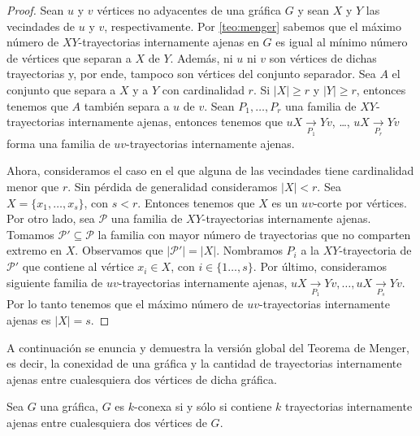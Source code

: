 \begin{proof}
    Sean $u$ y $v$ v\'ertices no adyacentes de una gr\'afica $G$ y sean $X$ y
    $Y$ las vecindades de $u$ y $v$, respectivamente. Por \cref{teo:menger}
    sabemos que el m\'aximo n\'umero de $XY$-trayectorias internamente ajenas en
    $G$ es igual al m\'inimo n\'umero de v\'ertices que separan a $X$ de $Y$.
    Adem\'as, ni $u$ ni $v$ son v\'ertices de dichas trayectorias y, por ende,
    tampoco son v\'ertices del conjunto separador. Sea  $A$ el conjunto que
    separa a $X$ y a $Y$ con cardinalidad $r$. Si $|X| \geq r$ y $|Y| \geq r$,
    entonces tenemos que $A$ tambi\'en separa a $u$ de $v$. Sean $P_1, \dots,
    P_r$ una familia de $XY$-trayectorias internamente ajenas, entonces tenemos
    que $uX\xrightarrow[P_1]{}Yv$, \dots, $uX\xrightarrow[P_r]{}Yv$ forma una
    familia de $uv$-trayectorias internamente ajenas. 

    Ahora, consideramos el caso en el que alguna de las vecindades tiene
    cardinalidad menor que $r$.  Sin p\'erdida de generalidad consideramos
    $|X|<r$. Sea $X = \{x_1, \dots, x_s\}$, con $s<r$. Entonces tenemos que $X$
    es un $uv$-corte por v\'ertices. Por otro lado, sea $\mathcal{P}$ una
    familia de $XY$-trayectorias internamente ajenas. Tomamos $\mathcal{P'}
    \subseteq \mathcal{P}$ la familia con mayor n\'umero de trayectorias que no
    comparten extremo en $X$. Observamos que $|\mathcal{P'}| = |X|$. Nombramos
    $P_i$ a la $XY$-trayectoria de $\mathcal{P'}$ que contiene al v\'ertice $x_i
    \in X$, con $i \in \{1 \dots, s\}$. Por \'ultimo, consideramos siguiente
    familia de $uv$-trayectorias internamente ajenas, $uX\xrightarrow[P_1]{}Yv,
    \dots, uX\xrightarrow[P_s]{}Yv$. Por lo tanto tenemos que el m\'aximo
    n\'umero de $uv$-trayectorias internamente ajenas es $|X|=s$.
\end{proof}


A continuaci\'on  se enuncia y demuestra la versi\'on global del Teorema de
Menger, es decir, la conexidad de una gr\'afica y la cantidad de trayectorias
internamente ajenas entre cualesquiera dos v\'ertices de dicha gr\'afica.

\begin{teorema}
    \label{teo:mengerGen}
     Sea $G$ una gr\'afica, $G$ es $k$-conexa si y s\'olo si contiene
     $k$ trayectorias internamente ajenas entre cualesquiera dos v\'ertices de
     $G$.
 \end{teorema}

